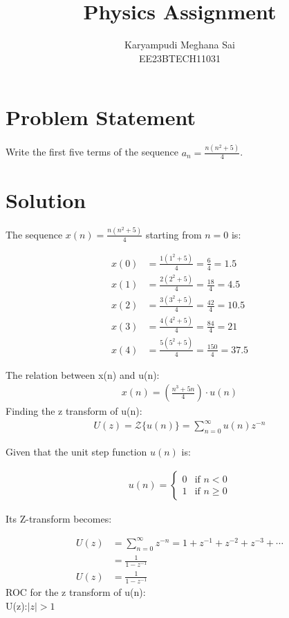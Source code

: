 \documentclass{article}
\begin{document}
\title{Physics Assignment}
\author{Karyampudi Meghana Sai\\ EE23BTECH11031}
\maketitle

\section*{Problem Statement}
Write the first five terms of the sequence \(a_n = \frac{n(n^2+5)}{4}\).

\section*{Solution}
The sequence \(x(n) = \frac{n(n^2+5)}{4}\) starting from \(n = 0\) is:

\begin{align*}
x(0) &= \frac{1(1^2+5)}{4} = \frac{6}{4} = 1.5 \\
x(1) &= \frac{2(2^2+5)}{4} = \frac{18}{4} = 4.5 \\
x(2) &= \frac{3(3^2+5)}{4} = \frac{42}{4} = 10.5 \\
x(3) &= \frac{4(4^2+5)}{4} = \frac{84}{4} = 21 \\
x(4) &= \frac{5(5^2+5)}{4} = \frac{150}{4} = 37.5 
\end{align*}



The relation between x(n) and u(n):
\begin{align}
 x(n) = \left(\frac{n^3+5n}{4}\right) \cdot u(n)
 \end{align}
Finding the z transform of u(n):
\begin{align}
U(z) = \mathcal{Z}\{u(n)\} = \sum_{n=0}^{\infty} u(n)z^{-n}
\end{align}

Given that the unit step function \(u(n)\) is:

\begin{align} 
u(n) = \begin{cases} 0 & \text{if } n < 0 \\ 1 & \text{if } n \geq 0 \end{cases}
 \end{align}

Its Z-transform becomes:

\begin{align}
U(z) &= \sum_{n=0}^{\infty} z^{-n} = 1 + z^{-1} + z^{-2} + z^{-3} + \dotsb \nonumber \\
&= \frac{1}{1 - z^{-1}} \nonumber \\
U(z) &= \frac{1}{1- z^{-1}}
\end{align}
ROC for the z transform of u(n):\\
 U(z):$\lvert z \rvert > 1$
\end{document}
